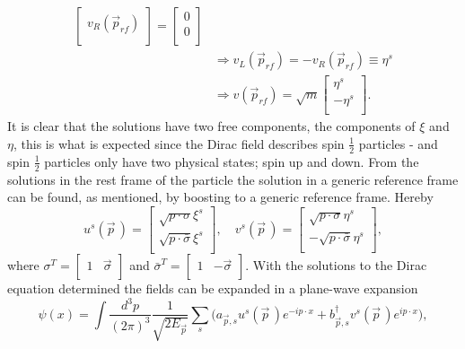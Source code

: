 \begin{enumerate}
\begin{equation}
\begin{split}
\begin{bmatrix}
		v_R(\vec{p}_{rf})\\
	\end{bmatrix}=\begin{bmatrix}
	0\\
	0\\
\end{bmatrix}\\
&\Rightarrow v_L(\vec{p}_{rf})=-v_R(\vec{p}_{rf})\equiv\eta^s\\
&\Rightarrow v(\vec{p}_{rf})=\sqrt{m}\begin{bmatrix}
	\eta^s\\
	-\eta^s\\
\end{bmatrix}.
\end{split}
\end{equation} 
It is clear that the solutions have two free components, the components of $\xi$ and $\eta$, this is what is expected since the Dirac field describes spin $\frac{1}{2}$ particles - and spin $\frac{1}{2}$ particles only have two physical states; spin up and down. From the solutions in the rest frame of the particle the solution in a generic reference frame can be found, as mentioned, by boosting to a generic reference frame. Hereby
\begin{equation}
	u^s(\vec{p}\,)=\begin{bmatrix}
		\sqrt{p\cdot \sigma} \xi^s\\
		\sqrt{p\cdot\bar{\sigma}}\xi^s\\
	\end{bmatrix}, \quad v^s(\vec{p}\,)=\begin{bmatrix}
	\sqrt{p\cdot \sigma} \eta^s\\
	-\sqrt{p\cdot\bar{\sigma}}\eta^s\\
\end{bmatrix},
\end{equation} 
where $\sigma^T=\begin{bmatrix}
1 & \vec{\sigma}\\
\end{bmatrix}$ and $\bar{\sigma}^T=\begin{bmatrix}
1 & -\vec{\sigma}\\
\end{bmatrix}$. 
With the solutions to the Dirac equation determined the fields can be expanded in a plane-wave expansion
\begin{equation}
	\psi(x)=\int \frac{d^3p}{(2\pi)^3}\frac{1}{\sqrt{2E_{\vec{p}}}}\sum_s\bigg(a_{\vec{p},s}u^s(\vec{p}\,)e^{-ip\cdot x}+b_{\vec{p},s}^\dagger v^s(\vec{p}\,)e^{ip\cdot x}\bigg),

\end{equation}
\end{enumerate}
